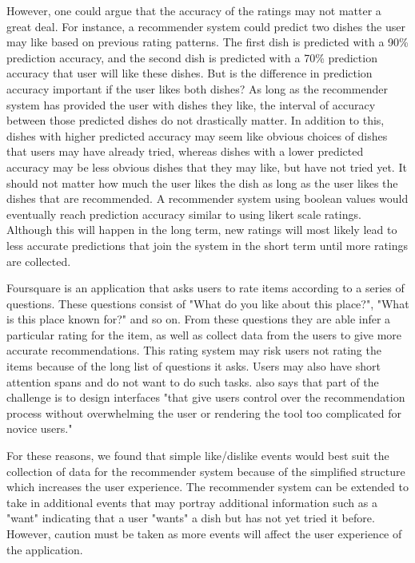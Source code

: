 However, one could argue that the accuracy of the ratings may not matter a great deal. For instance, a recommender system could predict two dishes the user  may like based on previous rating patterns. The first dish is predicted with a 90\% prediction accuracy, and the second dish is predicted with a 70\% prediction accuracy that user will like these dishes. But is the difference in prediction accuracy important if the user likes both dishes? As long as the recommender system has provided the user with dishes they like, the interval of accuracy between those predicted dishes do not drastically matter. In addition to this, dishes with higher predicted accuracy may seem like obvious choices of dishes that users may have already tried, whereas dishes with a lower predicted accuracy may be less obvious dishes that they may like, but have not tried yet. It should not matter how much the user likes the dish as long as the user likes the dishes that are recommended. A recommender system using boolean values would eventually reach prediction accuracy similar to using likert scale ratings. Although this will happen in the long term, new ratings will most likely lead to less accurate predictions that join the system in the short term until more ratings are collected. 

Foursquare is an application that asks users to rate items according to a series of questions. These questions consist of "What do you like about this place?", "What is this place known for?" and so on. From these questions they are able infer a particular rating for the item, as well as collect data from the users to give more accurate recommendations. This rating system may risk users not rating the items because of the long list of questions it asks. Users may also have short attention spans and do not want to do such tasks. \cite{martin2009recsys} also says that part of the challenge is to design interfaces "that give users control over the recommendation process without overwhelming the user or rendering the tool too complicated for novice users." 

For these reasons, we found that simple like/dislike events would best suit the collection of data for the recommender system because of the simplified structure which increases the user experience. The recommender system can be extended to take in additional events that may portray additional information such as a "want" indicating that a user "wants" a dish but has not yet tried it before. However, caution must be taken as more events will affect the user experience of the application. 

